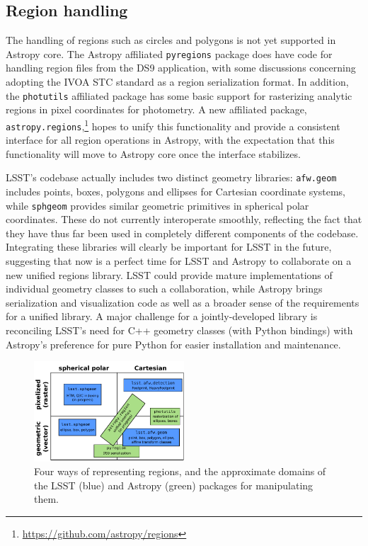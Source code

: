 \documentclass[]{spie}  %
\begin{document}
\subsection{Region handling}

The handling of regions such as circles and polygons is not yet supported in Astropy core.
The Astropy affiliated \texttt{pyregions} package does have code for handling region files from the DS9 application\cite{2005ASPC..347..110J}, with some discussions concerning adopting the IVOA STC standard\cite{2007ivoa.spec.1030R} as a region serialization format.
In addition, the \texttt{photutils} affiliated package has some basic support for rasterizing analytic regions in pixel coordinates for photometry.
A new affiliated package, \texttt{astropy.regions},\footnote{\url{https://github.com/astropy/regions}} hopes to unify this functionality and provide a consistent interface for all region operations in Astropy, with the expectation that this functionality will move to Astropy core once the interface stabilizes.

LSST's codebase actually includes two distinct geometry libraries:
\texttt{afw.geom} includes points, boxes, polygons and ellipses for Cartesian coordinate systems, while \texttt{sphgeom} provides similar geometric primitives in spherical polar coordinates.
These do not currently interoperate smoothly, reflecting the fact that they have thus far been used in completely different components of the codebase.
Integrating these libraries will clearly be important for LSST in the future, suggesting that now is a perfect time for LSST and Astropy to collaborate on a new unified regions library.
LSST could provide mature implementations of individual geometry classes to such a collaboration, while Astropy brings serialization and visualization code as well as a broader sense of the requirements for a unified library.
A major challenge for a jointly-developed library is reconciling LSST's need for C++ geometry classes (with Python bindings) with Astropy's preference for pure Python for easier installation and maintenance.

\begin{figure}[t]
\begin{center}
\includegraphics[width=0.5\textwidth]{regions}
\end{center}
\caption{Four ways of representing regions, and the approximate domains of the LSST (blue) and Astropy (green) packages for manipulating them.}
\label{fig:regions}
\end{figure}
\end{document}
